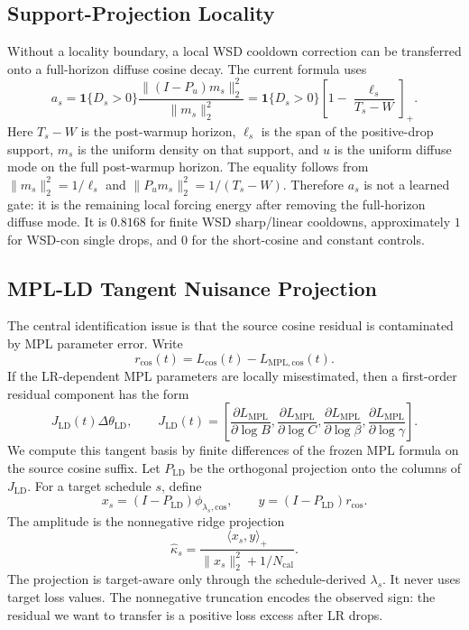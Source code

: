 \documentclass{article}
\newcommand{\MPL}{\mathrm{MPL}}
\newcommand{\LD}{\mathrm{LD}}
\newcommand{\cosine}{\mathrm{cos}}
\begin{document}
\subsection{Support-Projection Locality}
Without a locality boundary, a local WSD cooldown correction can be transferred onto a
full-horizon diffuse cosine decay.  The current formula uses
\begin{equation}\label{eq:locality}
  a_s
  =
  \mathbf 1\{D_s>0\}
  \frac{\|(I-P_u)m_s\|_2^2}{\|m_s\|_2^2}
  =
  \mathbf 1\{D_s>0\}
  \left[1-\frac{\ell_s}{T_s-W}\right]_+ .
\end{equation}
Here \(T_s-W\) is the post-warmup horizon, \(\ell_s\) is the span of the positive-drop
support, \(m_s\) is the uniform density on that support, and \(u\) is the uniform diffuse
mode on the full post-warmup horizon.  The equality follows from
\(\|m_s\|_2^2=1/\ell_s\) and \(\|P_u m_s\|_2^2=1/(T_s-W)\).  Therefore \(a_s\) is not a
learned gate: it is the remaining local forcing energy after removing the full-horizon
diffuse mode.  It is \(0.8168\) for finite WSD sharp/linear cooldowns, approximately \(1\)
for WSD-con single drops, and \(0\) for the short-cosine and constant controls.

\subsection{MPL-LD Tangent Nuisance Projection}
The central identification issue is that the source cosine residual is contaminated by MPL
parameter error.  Write
\begin{equation}
  r_{\cosine}(t)=L_{\cosine}(t)-L_{\MPL,\cosine}(t).
\end{equation}
If the LR-dependent MPL parameters are locally misestimated, then a first-order residual
component has the form
\begin{equation}
  J_{\LD}(t)\Delta\theta_{\LD},\qquad
  J_{\LD}(t)=
  \left[
  \frac{\partial L_{\MPL}}{\partial\log B},
  \frac{\partial L_{\MPL}}{\partial\log C},
  \frac{\partial L_{\MPL}}{\partial\log\beta},
  \frac{\partial L_{\MPL}}{\partial\log\gamma}
  \right].
\end{equation}
We compute this tangent basis by finite differences of the frozen MPL formula on the source
cosine suffix.  Let \(P_{\LD}\) be the orthogonal projection onto the columns of \(J_{\LD}\).
For a target schedule \(s\), define
\begin{equation}\label{eq:projection_xy}
  x_s=(I-P_{\LD})\phi_{\lambda_s,\cosine},\qquad
  y=(I-P_{\LD})r_{\cosine}.
\end{equation}
The amplitude is the nonnegative ridge projection
\begin{equation}\label{eq:kappa}
  \widehat\kappa_s
  =
  \frac{\langle x_s,y\rangle_+}
       {\|x_s\|_2^2+1/N_{\mathrm{cal}}} .
\end{equation}
The projection is target-aware only through the schedule-derived \(\lambda_s\).  It never
uses target loss values.  The nonnegative truncation encodes the observed sign: the residual
we want to transfer is a positive loss excess after LR drops.
\end{document}

